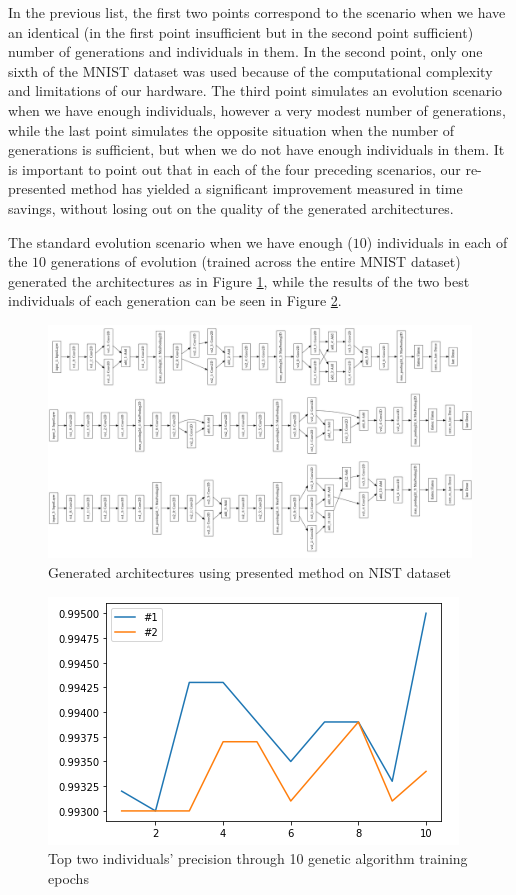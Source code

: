 \documentclass[eng]{simposium}
\begin{document}
In the previous list, the first two points correspond to the scenario when we have an identical 
(in the first point insufficient but in the second point sufficient) number of generations and individuals in them. 
In the second point, only one sixth of the MNIST dataset was used because of the computational complexity and limitations of our hardware. 
The third point simulates an evolution scenario when we have enough individuals, however a very modest number of generations, 
while the last point simulates the opposite situation when the number of generations is sufficient, but when we do not have 
enough individuals in them. 
It is important to point out that in each of the four preceding scenarios, our re-presented method has yielded a significant 
improvement measured in time savings, without losing out on the quality of the generated architectures. 

The standard evolution scenario when we have enough ($10$) individuals in each of the $10$ generations of evolution 
(trained across the entire MNIST dataset) generated the architectures as in Figure \ref{fig:architectures}, 
while the results of the two best individuals of each generation can be seen in Figure \ref{fig:top2}. 

\begin{figure}[!ht]
  \centering
  \includegraphics[width=1\textwidth]{arhitekture.png}
  \caption{Generated architectures using presented method on NIST dataset}
  \label{fig:architectures}
\end{figure}

\begin{figure}[!ht]
  \centering
  \includegraphics[]{top1.png}
  \caption{Top two individuals' precision through 10 genetic algorithm training epochs}
  \label{fig:top2}
\end{figure}
\end{document}

